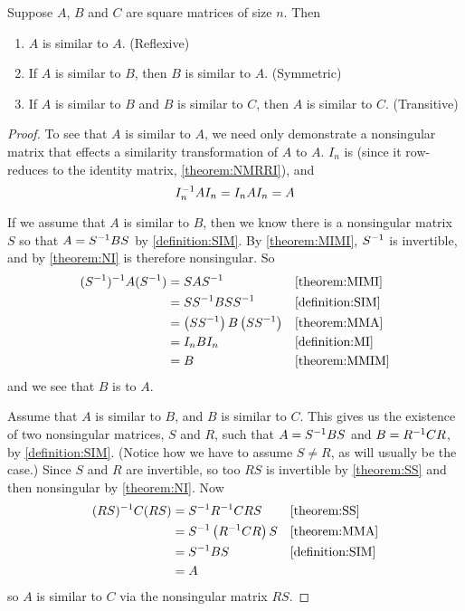 \documentclass{ximera}
\begin{document}
\begin{theorem}
\label{theorem:SER}

Suppose $A$, $B$ and $C$ are square matrices of size $n$.  Then
\begin{enumerate}\item $A$ is similar to $A$.  (Reflexive)
\item If $A$ is similar to $B$, then $B$ is similar to $A$.  (Symmetric)
\item If $A$ is similar to $B$ and $B$ is similar to $C$, then $A$ is similar to $C$.  (Transitive)
\end{enumerate}

\begin{proof}
To see that $A$ is similar to $A$, we need only demonstrate a nonsingular matrix that effects a similarity transformation of $A$ to $A$.  $I_n$ is 
 (since it row-reduces to the identity matrix, \ref{theorem:NMRRI}), and
\[
I_n^{-1}AI_n=I_nAI_n=A
\]

If we assume that $A$ is similar to $B$, then we know there is a nonsingular matrix $S$ so that $A=S^{-1}BS$ by \ref{definition:SIM}.  By \ref{theorem:MIMI}, $S^{-1}$ is invertible, and by \ref{theorem:NI} is therefore nonsingular.  So
\begin{align*}
(S^{-1})^{-1}A(S^{-1})&=SAS^{-1}&&\ref{theorem:MIMI}\\
&=SS^{-1}BSS^{-1}&&\ref{definition:SIM}\\
&=\left(SS^{-1}\right)B\left(SS^{-1}\right)&&\ref{theorem:MMA}\\
&=I_nBI_n&&\ref{definition:MI}\\
&=B&&\ref{theorem:MMIM}
\end{align*}
and we see that $B$ is  to $A$.

Assume that $A$ is similar to $B$, and $B$ is similar to $C$.  This gives us the existence of two nonsingular matrices, $S$ and $R$, such that $A=S^{-1}BS$ and $B=R^{-1}CR$, by \ref{definition:SIM}.  (Notice how we have to assume $S\neq R$, as will usually be the case.)  Since $S$ and $R$ are invertible, so too $RS$ is invertible by \ref{theorem:SS} and then nonsingular by \ref{theorem:NI}.  Now
\begin{align*}
(RS)^{-1}C(RS)&=S^{-1}R^{-1}CRS&&\ref{theorem:SS}\\
&=S^{-1}\left(R^{-1}CR\right)S&&\ref{theorem:MMA}\\
&=S^{-1}BS&&\ref{definition:SIM}\\
&=A
\end{align*}
so $A$ is similar to $C$ via the nonsingular matrix $RS$.
\end{proof}
\end{theorem}
\end{document}
